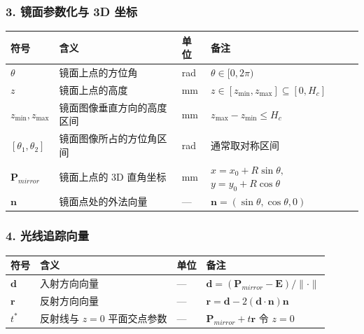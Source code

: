 \documentclass[12pt, a4paper]{ctexart}
\begin{document}
\subsubsection*{3. 镜面参数化与 3D 坐标}
\begin{table}[H]
\centering
\begin{tabularx}{\textwidth}{lllX}
\toprule
\textbf{符号} & \textbf{含义} & \textbf{单位} & \textbf{备注} \\
\midrule
$\theta$ & 镜面上点的方位角 & rad & $\theta \in [0, 2\pi)$ \\
$z$ & 镜面上点的高度 & mm & $z \in [z_{\min}, z_{\max}] \subseteq [0, H_c]$ \\
$z_{\min}, z_{\max}$ & 镜面图像垂直方向的高度区间 & mm & $z_{\max} - z_{\min} \leq H_c$ \\
$[\theta_1, \theta_2]$ & 镜面图像所占的方位角区间 & rad & 通常取对称区间 \\
$\mathbf{P}_{mirror}$ & 镜面上点的 3D 直角坐标 & mm & $x = x_0 + R\sin\theta,$ \newline $y = y_0 + R\cos\theta$ \\
$\mathbf{n}$ & 镜面点处的外法向量 & — & $\mathbf{n} = (\sin\theta, \cos\theta, 0)$ \\
\bottomrule
\end{tabularx}
\end{table}

\subsubsection*{4. 光线追踪向量}
\begin{table}[H]
\centering
\begin{tabularx}{\textwidth}{lllX}
\toprule
\textbf{符号} & \textbf{含义} & \textbf{单位} & \textbf{备注} \\
\midrule
$\mathbf{d}$ & 入射方向向量 & — & $\mathbf{d} = (\mathbf{P}_{mirror} - \mathbf{E}) / \lVert \cdot \rVert$ \\
$\mathbf{r}$ & 反射方向向量 & — & $\mathbf{r} = \mathbf{d} - 2(\mathbf{d}\cdot\mathbf{n})\mathbf{n}$ \\
$t^*$ & 反射线与 $z=0$ 平面交点参数 & — & $\mathbf{P}_{mirror} + t\mathbf{r}$ 令 $z=0$ \\
\bottomrule
\end{tabularx}
\end{table}
\end{document}
